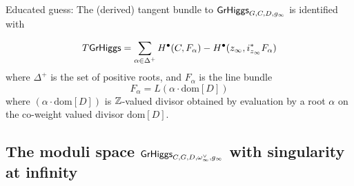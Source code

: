 \documentclass[12pt,psamsfonts,reqno]{amsart}
\begin{document}



Educated guess:  The (derived) tangent bundle to $\mathsf{GrHiggs}_{G,C,D,g_\infty}$ is identified with 


\begin{equation}
\label{eq:THiggs}
    T \mathsf{GrHiggs} = \sum_{\alpha \in \Delta^{+}} H^{\bullet}(C, F_\alpha) - H^{\bullet}(z_{\infty}, i_{z_\infty}^{*} F_\alpha)
\end{equation}
where $\Delta^{+}$ is the set of positive roots, and $F_\alpha$ is the line bundle 
\begin{equation}
    F_\alpha = L(\alpha \cdot \mathrm{dom}[D])
\end{equation}
where $(\alpha \cdot \mathrm{dom}[ D ])$ is $\mathbb Z$-valued divisor obtained by evaluation by a root $\alpha$ on the co-weight valued divisor $\mathrm{dom}[D]$.

 


\subsection{The moduli space  $\mathsf{GrHiggs}_{C,G,D, \omega_{\infty}^{\vee}, g_\infty}$ with
  singularity at infinity}
\end{document}
